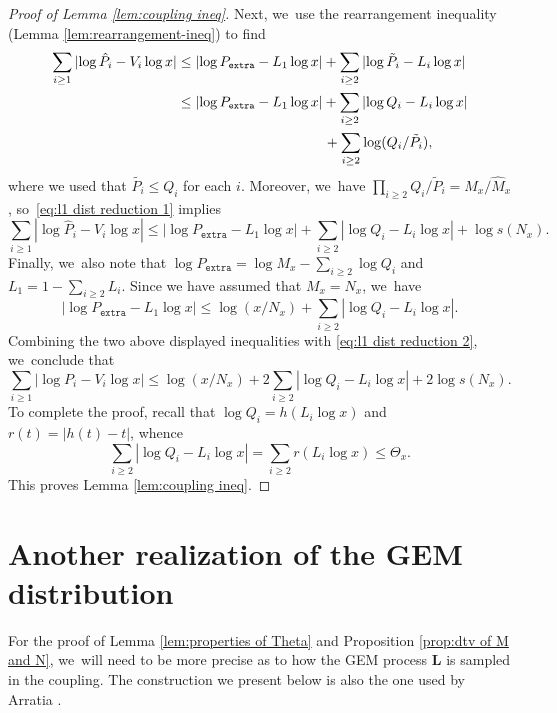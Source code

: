 \documentclass[JEP,XML,SOM,Unicode,published]{cedram}
\newcommand{\bL}{{\boldsymbol L}}
\newcommand{\pextra}{P_{\mathtt{extra}}}
\theoremstyle{plain}
\theoremstyle{definition}
\begin{document}
\begin{proof}[Proof of Lemma \ref{lem:coupling ineq}]
Next, we~use the rearrangement inequality (Lemma \ref{lem:rearrangement-ineq}) to find
\begin{align*}
\sum_{i \ge 1} |{\log \hat P_i - V_i\log x}| &\le |{\log \pextra - L_1\log x}|+ \sum_{i \ge 2} |{\log \tilde P_i - L_i\log x}| \\
&\le |{\log \pextra - L_1\log x}|+ \sum_{i \ge 2} |{\log Q_i - L_i\log x}| \\
&\hspace*{3.7cm} + \sum_{i \ge 2} \log(Q_i/\tilde P_i),
\end{align*}
where we used that $\tilde{P_i}\le Q_i$ for each $i$. Moreover, we~have $\prod_{i \ge 2} Q_i/\tilde P_i = M_x/\hat M_x$, so~\eqref{eq:l1 dist reduction 1} implies
\[
\sum_{i \ge 1} |{\log \hat P_i - V_i\log x}|
\le |{\log \pextra - L_1\log x}|+ \sum_{i \ge 2} |{\log Q_i - L_i\log x}| + \log s(N_x).
\]
Finally, we~also note that $\log \pextra = \log M_x - \sum_{i \ge 2} \log Q_i$ and $L_1 = 1-\sum_{i \ge 2} L_i$. Since we have assumed that $M_x=N_x$, we~have
\[
\label{eq:l1 dist reduction 4}
|{\log \pextra - L_1\log x}| \le \log(x/N_x) + \sum_{i \ge 2} |{\log Q_i - L_i\log x}|.
\]
Combining the two above displayed inequalities with \eqref{eq:l1 dist reduction 2}, we~conclude that
\[
\sum_{i \ge 1} |{\log P_i - V_i\log x}|\le \log(x/N_x) + 2\sum_{i \ge 2} |{\log Q_i - L_i\log x}| + 2\log s(N_x).
\]
To complete the proof, recall that $\log Q_i = h(L_i\log x)$ and $r(t) = |h(t) - t|$, whence
\[
\label{eq:l1 dist reduction 6}
\sum_{i \ge 2} |{\log Q_i - L_i\log x}| = \sum_{i \ge 2} r(L_i\log x) \le \Theta_x.
\]
This proves Lemma \ref{lem:coupling ineq}.
\end{proof}

\section{Another realization of the GEM distribution}
\label{sec:GEM}

For the proof of Lemma \ref{lem:properties of Theta} and Proposition \ref{prop:dtv of M and N}, we~will need to be more precise as to how the GEM process $\bL$ is sampled in the coupling. The construction we present below is also the one used by Arratia \cite{Arratia02}.
\end{document}
